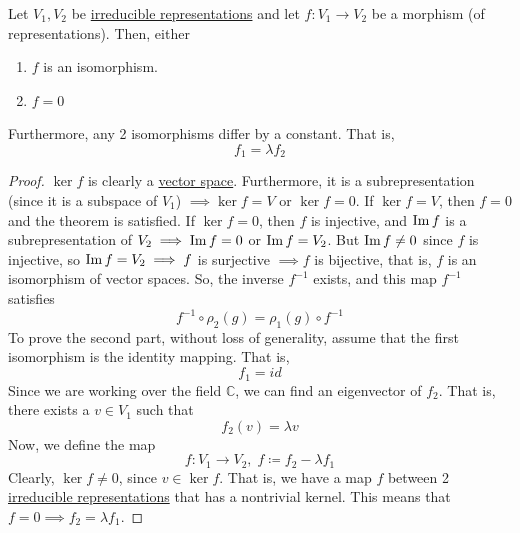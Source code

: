   \begin{lemma}
    \label{thm:schurs-lemma}
    Let $V_1, V_2$ be \hyperref[def:irreducible-representation]{irreducible representations} and let $f: V_1 \to V_2$ be a morphism (of representations). Then, either
    \begin{enumerate}
      \item $f$ is an isomorphism. 
      \item $f = 0$
    \end{enumerate}
    Furthermore, any 2 isomorphisms differ by a constant. That is, 
    \begin{equation}
      f_1 = \lambda f_2
    \end{equation}
  \end{lemma}
  \begin{proof}
    $\ker{f}$ is clearly a \hyperref[lin-def:vector-space]{vector space}. Furthermore, it is a subrepresentation (since it is a subspace of $V_1$) $\implies \ker{f} = V$ or $\ker{f} = 0$. If $\ker{f} = V$, then $f = 0$ and the theorem is satisfied. If $\ker{f} = 0$, then $f$ is injective, and $\operatorname{Im}{f}$ is a subrepresentation of $V_2 \implies \operatorname{Im}{f} = 0$ or $\operatorname{Im}{f} = V_2$. But $\operatorname{Im}{f} \neq 0$ since $f$ is injective, so $\operatorname{Im}{f} = V_2 \implies f$ is surjective $\implies f$ is bijective, that is, $f$ is an isomorphism of vector spaces. So, the inverse $f^{-1}$ exists, and this map $f^{-1}$ satisfies
    \begin{equation}
      f^{-1} \circ \rho_2(g) = \rho_1 (g) \circ f^{-1}
    \end{equation}
    To prove the second part, without loss of generality, assume that the first isomorphism is the identity mapping. That is, 
    \begin{equation}
      f_1 = id
    \end{equation}
    Since we are working over the field $\mathbb{C}$, we can find an eigenvector of $f_2$. That is, there exists a $v \in V_1$ such that 
    \begin{equation}
      f_2 (v) = \lambda v
    \end{equation}
    Now, we define the map
    \begin{equation}
      f: V_1 \to V_2, \; f \coloneqq f_2 - \lambda f_1
    \end{equation}
    Clearly, $\ker{f} \neq 0$, since $v \in \ker{f}$. That is, we have a map $f$ between 2 \hyperref[def:irreducible-representation]{irreducible representations} that has a nontrivial kernel. This means that $f = 0 \implies f_2 = \lambda f_1$.  
  \end{proof}

